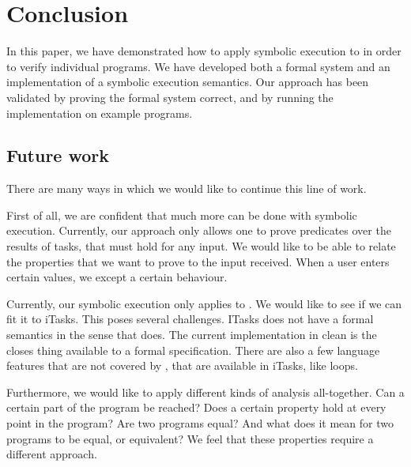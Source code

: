 
\section{Conclusion}

\label{sec:conclusion}

In this paper, we have demonstrated how to apply symbolic execution to \TOPHAT in order to verify individual programs.
We have developed both a formal system and an implementation of a symbolic execution semantics.
Our approach has been validated by proving the formal system correct, and by running the implementation on example programs.

\subsection{Future work}

There are many ways in which we would like to continue this line of work.

First of all, we are confident that much more can be done with symbolic execution.
Currently, our approach only allows one to prove predicates over the results of tasks, that must hold for any input.
We would like to be able to relate the properties that we want to prove to the input received.
When a user enters certain values, we except a certain behaviour.

Currently, our symbolic execution only applies to \TOPHAT.
We would like to see if we can fit it to iTasks.
This poses several challenges.
ITasks does not have a formal semantics in the sense that \TOPHAT does.
The current implementation in clean is the closes thing available to a formal specification.
There are also a few language features that are not covered by \TOPHAT, that are available in iTasks, like loops.


Furthermore, we would like to apply different kinds of analysis all-together.
Can a certain part of the program be reached?
Does a certain property hold at every point in the program?
Are two programs equal? And what does it mean for two programs to be equal, or equivalent?
We feel that these properties require a different  approach.
